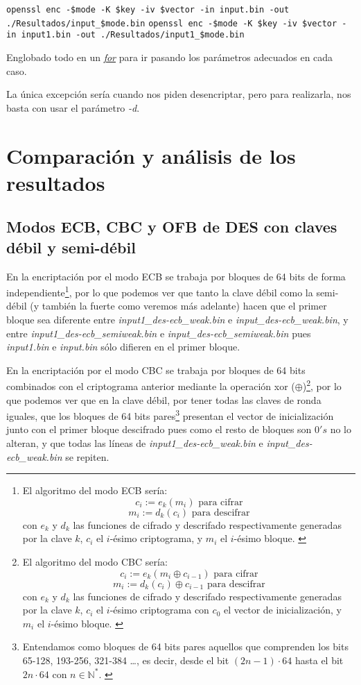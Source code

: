 \documentclass[a4paper, 11pt]{article}
\begin{document}
		\begin{small}
			\verb|openssl enc -$mode -K $key -iv $vector -in input.bin -out ./Resultados/input_$mode.bin|
			\verb|openssl enc -$mode -K $key -iv $vector -in input1.bin -out ./Resultados/input1_$mode.bin|
		\end{small}
		
		Englobado todo en un \href{http://manpages.ubuntu.com/manpages/zesty/en/man3/for.3tcl.html}{\textit{for}} para ir
		pasando los parámetros adecuados en cada caso.
		
		La única excepción sería cuando nos piden desencriptar, pero para realizarla, nos basta con usar el parámetro \textit{-d}.
	
\section{Comparación y análisis de los resultados}
	\subsection{Modos ECB, CBC y OFB de DES con claves débil y semi-débil}
		En la encriptación por el modo ECB se trabaja por bloques de 64 bits de forma independiente\footnote{El algoritmo del
		modo ECB sería: \[c_i := e_k(m_i) \text{ para cifrar}\] \[m_i := d_k(c_i) \text{ para descifrar}\] con $e_k$ y $d_k$
		las funciones de cifrado y descrifado respectivamente generadas por la clave $k$, $c_i$ el $i$-ésimo criptograma, y
		$m_i$ el $i$-ésimo bloque. \label{ecb}}, por lo que podemos ver que tanto la clave débil como la semi-débil (y también
		la fuerte como veremos más adelante) hacen que el primer bloque sea diferente entre	\textit{input1\_des-ecb\_weak.bin}
		e \textit{input\_des-ecb\_weak.bin}, y entre \textit{input1\_des-ecb\_semiweak.bin} e \textit{input\_des-ecb\_semiweak.bin}
		pues \textit{input1.bin} e \textit{input.bin} sólo difieren en el primer bloque.
		
		En la encriptación por el modo CBC se trabaja por bloques de 64 bits combinados con el criptograma anterior mediante la
		operación xor ($\oplus$)\footnote{El algoritmo del modo CBC sería: \[c_i := e_k(m_i \oplus c_{i-1})\text{ para cifrar}\]
		\[m_i := d_k(c_i) \oplus c_{i-1} \text{ para descifrar}\] con $e_k$ y $d_k$ las funciones de cifrado y descrifado
		respectivamente generadas por la clave $k$, $c_i$ el $i$-ésimo criptograma con $c_0$ el vector de inicialización, y $m_i$
		el $i$-ésimo bloque. \label{cbc}}, por lo que podemos ver que en la clave débil, por tener todas las claves de ronda
		iguales, que los bloques de 64 bits pares\footnote{Entendamos como bloques de 64 bits pares aquellos que comprenden
		los bits 65-128, 193-256, 321-384 \dots, es decir, desde el bit $(2n-1) \cdot 64$ hasta el bit $2n \cdot 64$ con $n
		\in \mathbb{N}^*$. \label{bits-parity}} presentan el vector de inicialización junto con el primer bloque descifrado
		pues como el resto de bloques son $0's$ no lo alteran, y que todas las líneas de \textit{input1\_des-ecb\_weak.bin}
		e \textit{input\_des-ecb\_weak.bin} se repiten.
\end{document}
